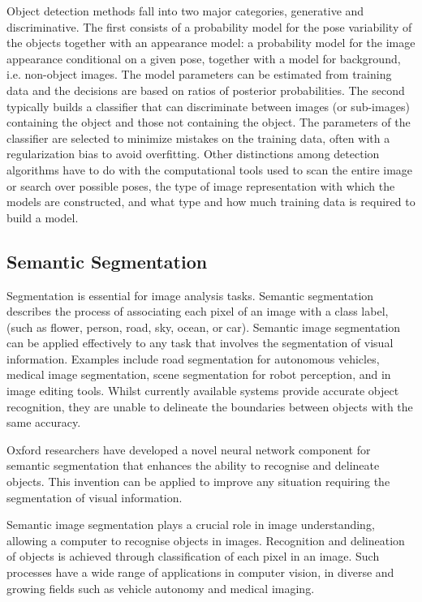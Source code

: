 Object detection methods fall into two major categories, generative and discriminative. The first consists of a probability model for the pose variability of the objects together with an appearance model: a probability model for the image appearance conditional on a given pose, together with a model for background, i.e. non-object images. The model parameters can be estimated from training data and the decisions are based on ratios of posterior probabilities. The second typically builds a classifier that can discriminate between images (or sub-images) containing the object and those not containing the object. The parameters of the classifier are selected to minimize mistakes on the training data, often with a regularization bias to avoid overfitting. Other distinctions among detection algorithms have to do with the computational tools used to scan the entire image or search over possible poses, the type of image representation with which the models are constructed, and what type and how much training data is required to build a model.	



\subsection{
Semantic Segmentation
}
Segmentation is essential for image analysis tasks. Semantic segmentation describes the process of associating each pixel of an image with a class label, (such as flower, person, road, sky, ocean, or car).
Semantic image segmentation can be applied effectively to any task that involves the segmentation of visual information. Examples include road segmentation for autonomous vehicles, medical image segmentation, scene segmentation for robot perception, and in image editing tools. Whilst currently available systems provide accurate object recognition, they are unable to delineate the boundaries between objects with the same accuracy.

Oxford researchers have developed a novel neural network component for semantic segmentation that enhances the ability to recognise and delineate objects. This invention can be applied to improve any situation requiring the segmentation of visual information.

Semantic image segmentation plays a crucial role in image understanding, allowing a computer to recognise objects in images. Recognition and delineation of objects is achieved through classification of each pixel in an image. Such processes have a wide range of applications in computer vision, in diverse and growing fields such as vehicle autonomy and medical imaging.

